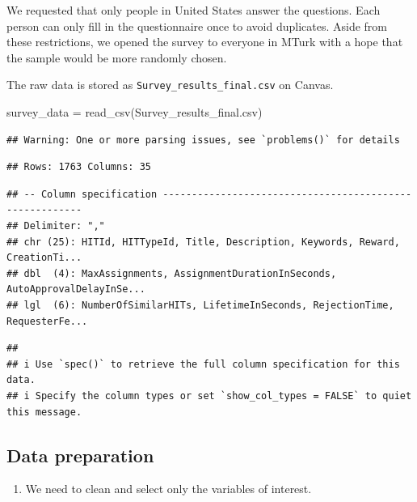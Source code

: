 \documentclass[
]{article}
\newenvironment{Shaded}{\begin{snugshade}}{\end{snugshade}}
\newcommand{\FunctionTok}[1]{\textcolor[rgb]{0.00,0.00,0.00}{#1}}
\newcommand{\NormalTok}[1]{#1}
\newcommand{\OtherTok}[1]{\textcolor[rgb]{0.56,0.35,0.01}{#1}}
\newcommand{\StringTok}[1]{\textcolor[rgb]{0.31,0.60,0.02}{#1}}
\providecommand{\tightlist}{%
  \setlength{\itemsep}{0pt}\setlength{\parskip}{0pt}}
\begin{document}
We requested that only people in United States answer the questions.
Each person can only fill in the questionnaire once to avoid duplicates.
Aside from these restrictions, we opened the survey to everyone in MTurk
with a hope that the sample would be more randomly chosen.

The raw data is stored as \texttt{Survey\_results\_final.csv} on Canvas.

\begin{Shaded}
\begin{Highlighting}[]
\NormalTok{survey\_data }\OtherTok{=} \FunctionTok{read\_csv}\NormalTok{(}\StringTok{\textquotesingle{}Survey\_results\_final.csv\textquotesingle{}}\NormalTok{)}
\end{Highlighting}
\end{Shaded}

\begin{verbatim}
## Warning: One or more parsing issues, see `problems()` for details
\end{verbatim}

\begin{verbatim}
## Rows: 1763 Columns: 35
\end{verbatim}

\begin{verbatim}
## -- Column specification --------------------------------------------------------
## Delimiter: ","
## chr (25): HITId, HITTypeId, Title, Description, Keywords, Reward, CreationTi...
## dbl  (4): MaxAssignments, AssignmentDurationInSeconds, AutoApprovalDelayInSe...
## lgl  (6): NumberOfSimilarHITs, LifetimeInSeconds, RejectionTime, RequesterFe...
\end{verbatim}

\begin{verbatim}
## 
## i Use `spec()` to retrieve the full column specification for this data.
## i Specify the column types or set `show_col_types = FALSE` to quiet this message.
\end{verbatim}

\hypertarget{data-preparation}{%
\subsection{Data preparation}\label{data-preparation}}

\begin{enumerate}
\def\labelenumi{\roman{enumi}.}
\tightlist
\item
  We need to clean and select only the variables of interest.
\end{enumerate}
\end{document}
